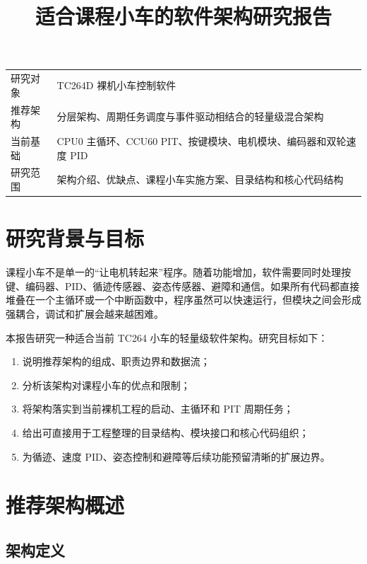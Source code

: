 \documentclass[11pt,a4paper,fontset=fandol]{ctexart}
\title{\heiti 适合课程小车的软件架构研究报告}
\author{}
\date{}
\begin{document}
\maketitle
\vspace{-2em}

\begin{center}
\begin{tabular}{p{}p{}}
\toprule
研究对象 & TC264D 裸机小车控制软件 \\
推荐架构 & 分层架构、周期任务调度与事件驱动相结合的轻量级混合架构 \\
当前基础 & CPU0 主循环、CCU60 PIT、按键模块、电机模块、编码器和双轮速度 PID \\
研究范围 & 架构介绍、优缺点、课程小车实施方案、目录结构和核心代码结构 \\
\bottomrule
\end{tabular}
\end{center}

\section{研究背景与目标}

课程小车不是单一的“让电机转起来”程序。随着功能增加，软件需要同时处理按键、编码器、PID、循迹传感器、姿态传感器、避障和通信。如果所有代码都直接堆叠在一个主循环或一个中断函数中，程序虽然可以快速运行，但模块之间会形成强耦合，调试和扩展会越来越困难。

本报告研究一种适合当前 TC264 小车的轻量级软件架构。研究目标如下：

\begin{enumerate}
\item 说明推荐架构的组成、职责边界和数据流；
\item 分析该架构对课程小车的优点和限制；
\item 将架构落实到当前裸机工程的启动、主循环和 PIT 周期任务；
\item 给出可直接用于工程整理的目录结构、模块接口和核心代码组织；
\item 为循迹、速度 PID、姿态控制和避障等后续功能预留清晰的扩展边界。
\end{enumerate}

\section{推荐架构概述}

\subsection{架构定义}
\end{document}
